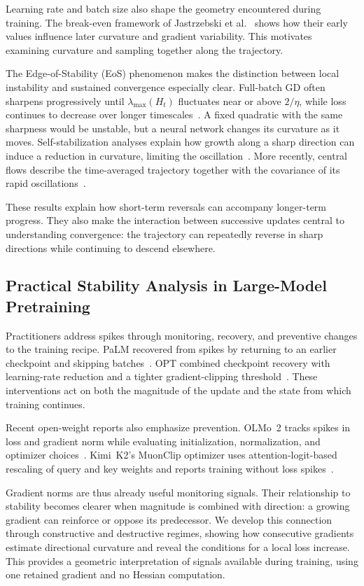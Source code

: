 Learning rate and batch size also shape the geometry encountered during
training. The break-even framework of Jastrzebski et al.~\cite{jastrzebski2020break}
shows how their early values influence later curvature and gradient
variability. This motivates examining curvature and sampling together
along the trajectory.

The Edge-of-Stability (EoS) phenomenon makes the distinction between local
instability and sustained convergence especially clear. Full-batch GD
often sharpens progressively until $\lambda_{\max}(H_t)$ fluctuates near
or above $2/\eta$, while loss continues to decrease over longer
timescales~\cite{cohen2021edge, arora2022understanding}. A fixed quadratic
with the same sharpness would be unstable, but a neural network changes
its curvature as it moves. Self-stabilization analyses explain how growth
along a sharp direction can induce a reduction in curvature, limiting the
oscillation~\cite{damian2023self}. More recently, central flows describe
the time-averaged trajectory together with the covariance of its rapid
oscillations~\cite{cohen2025central}.

These results explain how short-term reversals can accompany longer-term
progress. They also make the interaction between successive updates
central to understanding convergence: the trajectory can repeatedly
reverse in sharp directions while continuing to descend elsewhere.

\subsection{Practical Stability Analysis in Large-Model Pretraining}
\label{subsec:practical-stability}

Practitioners address spikes through monitoring, recovery, and preventive
changes to the training recipe. PaLM recovered from spikes by returning
to an earlier checkpoint and skipping batches~\cite{chowdhery2022palm}.
OPT combined checkpoint recovery with learning-rate reduction and a
tighter gradient-clipping threshold~\cite{zhang2022opt}. These interventions
act on both the magnitude of the update and the state from which training
continues.

Recent open-weight reports also emphasize prevention. OLMo~2 tracks
spikes in loss and gradient norm while evaluating initialization,
normalization, and optimizer choices~\cite{olmo2025furious}. Kimi~K2's
MuonClip optimizer uses attention-logit-based rescaling of query and key
weights and reports training without loss spikes~\cite{kimi2025k2}.

Gradient norms are thus already useful monitoring signals. Their
relationship to stability becomes clearer when magnitude is combined
with direction: a growing gradient can reinforce or oppose its
predecessor. We develop this connection through constructive and
destructive regimes, showing how consecutive gradients estimate
directional curvature and reveal the conditions for a local loss
increase. This provides a geometric interpretation of signals available
during training, using one retained gradient and no Hessian computation.
